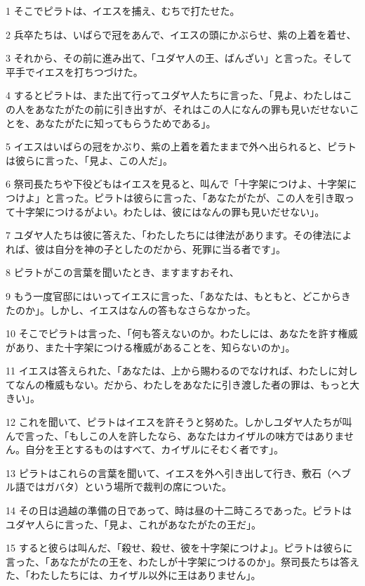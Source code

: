 \par 1 そこでピラトは、イエスを捕え、むちで打たせた。
\par 2 兵卒たちは、いばらで冠をあんで、イエスの頭にかぶらせ、紫の上着を着せ、
\par 3 それから、その前に進み出て、「ユダヤ人の王、ばんざい」と言った。そして平手でイエスを打ちつづけた。
\par 4 するとピラトは、また出て行ってユダヤ人たちに言った、「見よ、わたしはこの人をあなたがたの前に引き出すが、それはこの人になんの罪も見いだせないことを、あなたがたに知ってもらうためである」。
\par 5 イエスはいばらの冠をかぶり、紫の上着を着たままで外へ出られると、ピラトは彼らに言った、「見よ、この人だ」。
\par 6 祭司長たちや下役どもはイエスを見ると、叫んで「十字架につけよ、十字架につけよ」と言った。ピラトは彼らに言った、「あなたがたが、この人を引き取って十字架につけるがよい。わたしは、彼にはなんの罪も見いだせない」。
\par 7 ユダヤ人たちは彼に答えた、「わたしたちには律法があります。その律法によれば、彼は自分を神の子としたのだから、死罪に当る者です」。
\par 8 ピラトがこの言葉を聞いたとき、ますますおそれ、
\par 9 もう一度官邸にはいってイエスに言った、「あなたは、もともと、どこからきたのか」。しかし、イエスはなんの答もなさらなかった。
\par 10 そこでピラトは言った、「何も答えないのか。わたしには、あなたを許す権威があり、また十字架につける権威があることを、知らないのか」。
\par 11 イエスは答えられた、「あなたは、上から賜わるのでなければ、わたしに対してなんの権威もない。だから、わたしをあなたに引き渡した者の罪は、もっと大きい」。
\par 12 これを聞いて、ピラトはイエスを許そうと努めた。しかしユダヤ人たちが叫んで言った、「もしこの人を許したなら、あなたはカイザルの味方ではありません。自分を王とするものはすべて、カイザルにそむく者です」。
\par 13 ピラトはこれらの言葉を聞いて、イエスを外へ引き出して行き、敷石（ヘブル語ではガバタ）という場所で裁判の席についた。
\par 14 その日は過越の準備の日であって、時は昼の十二時ころであった。ピラトはユダヤ人らに言った、「見よ、これがあなたがたの王だ」。
\par 15 すると彼らは叫んだ、「殺せ、殺せ、彼を十字架につけよ」。ピラトは彼らに言った、「あなたがたの王を、わたしが十字架につけるのか」。祭司長たちは答えた、「わたしたちには、カイザル以外に王はありません」。
